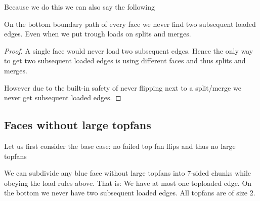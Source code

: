 Because we do this we can also say the following

\begin{lemma}
  \label{lm:}
  On the bottom boundary path of every face we never find two subsequent loaded edges. Even when we put trough loads on splits and merges.
\end{lemma}
\begin{proof}
  A single face would never load two subsequent edges. Hence the only way to get two subsequent loaded edges is using different faces and thus splits and merges.

  However due to the built-in safety of never flipping next to a split/merge we never get subsequent    loaded edges.
\end{proof}


\subsection{Faces without large topfans}
Let us first consider the base case: no failed top fan flips and thus no large topfans

\begin{lemma}
  \label{lm:}
  We can subdivide any blue face without large topfans into 7-sided chunks while obeying the load rules above.
  That is: We have at most one toploaded edge. On the bottom we never have two subsequent loaded edges. All topfans are of size 2.
\end{lemma}

